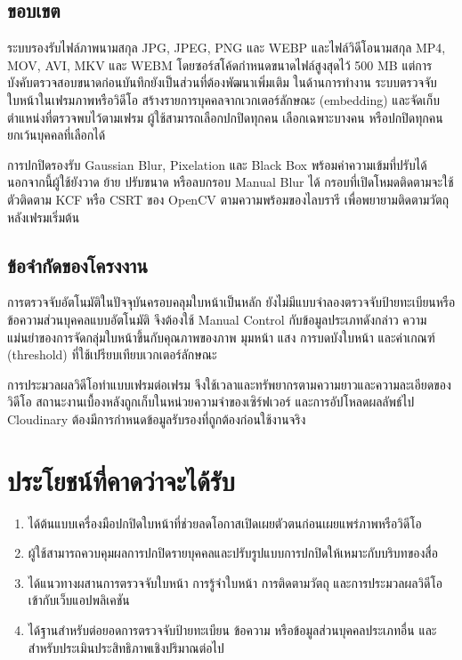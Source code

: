 \subsection{ขอบเขต}

ระบบรองรับไฟล์ภาพนามสกุล JPG, JPEG, PNG และ WEBP และไฟล์วิดีโอนามสกุล MP4, MOV, AVI, MKV และ WEBM โดยซอร์สโค้ดกำหนดขนาดไฟล์สูงสุดไว้ 500 MB แต่การบังคับตรวจสอบขนาดก่อนบันทึกยังเป็นส่วนที่ต้องพัฒนาเพิ่มเติม ในด้านการทำงาน ระบบตรวจจับใบหน้าในเฟรมภาพหรือวิดีโอ สร้างรายการบุคคลจากเวกเตอร์ลักษณะ (embedding) และจัดเก็บตำแหน่งที่ตรวจพบไว้ตามเฟรม ผู้ใช้สามารถเลือกปกปิดทุกคน เลือกเฉพาะบางคน หรือปกปิดทุกคนยกเว้นบุคคลที่เลือกได้

การปกปิดรองรับ Gaussian Blur, Pixelation และ Black Box พร้อมค่าความเข้มที่ปรับได้ นอกจากนี้ผู้ใช้ยังวาด ย้าย ปรับขนาด หรือลบกรอบ Manual Blur ได้ กรอบที่เปิดโหมดติดตามจะใช้ตัวติดตาม KCF หรือ CSRT ของ OpenCV ตามความพร้อมของไลบรารี เพื่อพยายามติดตามวัตถุหลังเฟรมเริ่มต้น

\subsection{ข้อจำกัดของโครงงาน}

การตรวจจับอัตโนมัติในปัจจุบันครอบคลุมใบหน้าเป็นหลัก ยังไม่มีแบบจำลองตรวจจับป้ายทะเบียนหรือข้อความส่วนบุคคลแบบอัตโนมัติ จึงต้องใช้ Manual Control กับข้อมูลประเภทดังกล่าว ความแม่นยำของการจัดกลุ่มใบหน้าขึ้นกับคุณภาพของภาพ มุมหน้า แสง การบดบังใบหน้า และค่าเกณฑ์ (threshold) ที่ใช้เปรียบเทียบเวกเตอร์ลักษณะ

การประมวลผลวิดีโอทำแบบเฟรมต่อเฟรม จึงใช้เวลาและทรัพยากรตามความยาวและความละเอียดของวิดีโอ สถานะงานเบื้องหลังถูกเก็บในหน่วยความจำของเซิร์ฟเวอร์ และการอัปโหลดผลลัพธ์ไป Cloudinary ต้องมีการกำหนดข้อมูลรับรองที่ถูกต้องก่อนใช้งานจริง

\section{ประโยชน์ที่คาดว่าจะได้รับ}

\begin{enumerate}
    \item ได้ต้นแบบเครื่องมือปกปิดใบหน้าที่ช่วยลดโอกาสเปิดเผยตัวตนก่อนเผยแพร่ภาพหรือวิดีโอ
    \item ผู้ใช้สามารถควบคุมผลการปกปิดรายบุคคลและปรับรูปแบบการปกปิดให้เหมาะกับบริบทของสื่อ
    \item ได้แนวทางผสานการตรวจจับใบหน้า การรู้จำใบหน้า การติดตามวัตถุ และการประมวลผลวิดีโอเข้ากับเว็บแอปพลิเคชัน
    \item ได้ฐานสำหรับต่อยอดการตรวจจับป้ายทะเบียน ข้อความ หรือข้อมูลส่วนบุคคลประเภทอื่น และสำหรับประเมินประสิทธิภาพเชิงปริมาณต่อไป
\end{enumerate}
